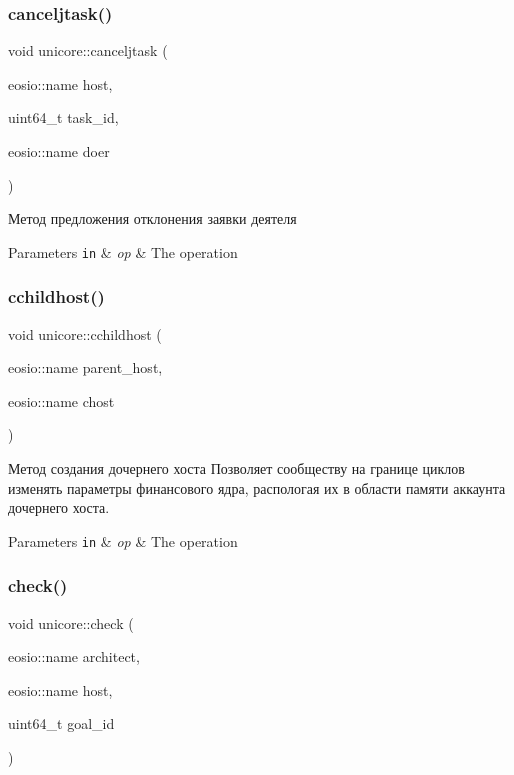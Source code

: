 \subsubsection{\texorpdfstring{canceljtask()}{canceljtask()}}
{\footnotesize\ttfamily void unicore\+::canceljtask (\begin{DoxyParamCaption}\item[{eosio\+::name}]{host,  }\item[{uint64\+\_\+t}]{task\+\_\+id,  }\item[{eosio\+::name}]{doer }\end{DoxyParamCaption})}



Метод предложения отклонения заявки деятеля 


\begin{DoxyParams}[1]{Parameters}
\mbox{\tt in}  & {\em op} & The operation \\
\hline
\end{DoxyParams}
\mbox{\label{classunicore_abae3b92d93cbbbd1058005639975f09d}} 
\subsubsection{\texorpdfstring{cchildhost()}{cchildhost()}}
{\footnotesize\ttfamily void unicore\+::cchildhost (\begin{DoxyParamCaption}\item[{eosio\+::name}]{parent\+\_\+host,  }\item[{eosio\+::name}]{chost }\end{DoxyParamCaption})}



Метод создания дочернего хоста Позволяет сообществу на границе циклов изменять параметры финансового ядра, распологая их в области памяти аккаунта дочернего хоста. 


\begin{DoxyParams}[1]{Parameters}
\mbox{\tt in}  & {\em op} & The operation \\
\hline
\end{DoxyParams}
\mbox{\label{classunicore_ac31cf68445b14c4dbdea9684a0556f10}} 
\subsubsection{\texorpdfstring{check()}{check()}}
{\footnotesize\ttfamily void unicore\+::check (\begin{DoxyParamCaption}\item[{eosio\+::name}]{architect,  }\item[{eosio\+::name}]{host,  }\item[{uint64\+\_\+t}]{goal\+\_\+id }\end{DoxyParamCaption})}



